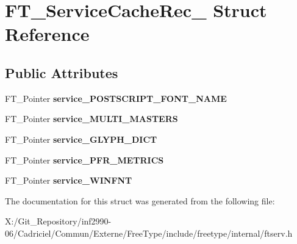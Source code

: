 \hypertarget{struct_f_t___service_cache_rec__}{\section{F\-T\-\_\-\-Service\-Cache\-Rec\-\_\- Struct Reference}
\label{struct_f_t___service_cache_rec__}
}
\subsection*{Public Attributes}
\begin{DoxyCompactItemize}
\item 
\hypertarget{struct_f_t___service_cache_rec___a1b95ee574621c8b031fe239d449bfa5c}{F\-T\-\_\-\-Pointer {\bfseries service\-\_\-\-P\-O\-S\-T\-S\-C\-R\-I\-P\-T\-\_\-\-F\-O\-N\-T\-\_\-\-N\-A\-M\-E}}\label{struct_f_t___service_cache_rec___a1b95ee574621c8b031fe239d449bfa5c}

\item 
\hypertarget{struct_f_t___service_cache_rec___abf51ac75b59eeac29ad5e4bbbc50e749}{F\-T\-\_\-\-Pointer {\bfseries service\-\_\-\-M\-U\-L\-T\-I\-\_\-\-M\-A\-S\-T\-E\-R\-S}}\label{struct_f_t___service_cache_rec___abf51ac75b59eeac29ad5e4bbbc50e749}

\item 
\hypertarget{struct_f_t___service_cache_rec___af8bbf442f497ad21666069ec33aaa88a}{F\-T\-\_\-\-Pointer {\bfseries service\-\_\-\-G\-L\-Y\-P\-H\-\_\-\-D\-I\-C\-T}}\label{struct_f_t___service_cache_rec___af8bbf442f497ad21666069ec33aaa88a}

\item 
\hypertarget{struct_f_t___service_cache_rec___ac5d029d7f442e8b727c40d5a88faa344}{F\-T\-\_\-\-Pointer {\bfseries service\-\_\-\-P\-F\-R\-\_\-\-M\-E\-T\-R\-I\-C\-S}}\label{struct_f_t___service_cache_rec___ac5d029d7f442e8b727c40d5a88faa344}

\item 
\hypertarget{struct_f_t___service_cache_rec___abb824452cfb20932fbd22405323781f9}{F\-T\-\_\-\-Pointer {\bfseries service\-\_\-\-W\-I\-N\-F\-N\-T}}\label{struct_f_t___service_cache_rec___abb824452cfb20932fbd22405323781f9}

\end{DoxyCompactItemize}


The documentation for this struct was generated from the following file\-:\begin{DoxyCompactItemize}
\item 
X\-:/\-Git\-\_\-\-Repository/inf2990-\/06/\-Cadriciel/\-Commun/\-Externe/\-Free\-Type/include/freetype/internal/ftserv.\-h\end{DoxyCompactItemize}
